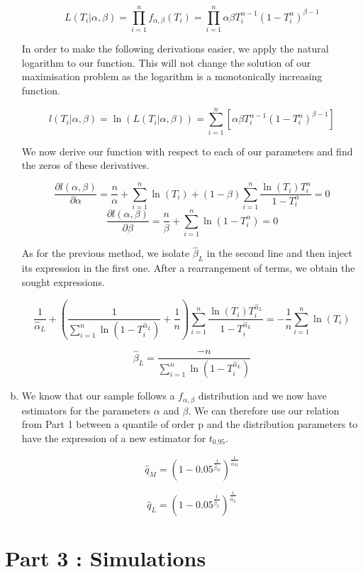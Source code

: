 \documentclass[a4paper]{article}
\begin{document}
\begin{enumerate}[(a)]
$$L(T_i|\alpha,\beta) = \prod_{i=1}^{n} f_{\alpha,\beta}(T_i) = \prod_{i=1}^{n} \alpha\beta T_i^{\alpha-1}(1-T_i^\alpha)^{\beta-1}$$

In order to make the following derivations easier, we apply the natural logarithm to our function. This will not change the solution of our maximisation problem as the logarithm is a monotonically increasing function.

$$l(T_i|\alpha,\beta) = \ln(L(T_i|\alpha,\beta)) = \sum_{i=1}^n \left [ \alpha\beta T_i^{\alpha-1}(1-T_i^\alpha)^{\beta-1} \right ]$$

We now derive our function with respect to each of our parameters and find the zeros of these derivatives.

$$ \frac{\partial l(\alpha, \beta)}{\partial \alpha} = \frac{n}{\alpha} + \sum_{i=1}^n \ln(T_i) + (1-\beta) \sum_{i=1}^{n} \frac{\ln(T_i) T_i^\alpha}{1-T_i^\alpha} = 0$$
$$ \frac{\partial l(\alpha, \beta)}{\partial \beta} = \frac{n}{\beta} + \sum_{i=1}^{n} \ln(1- T_i^\alpha)=0$$

As for the previous method, we isolate $\hat{\beta}_L$ in the second line and then inject its expression in the first one. After a rearrangement of terms, we obtain the sought expressions.

$$\frac{1}{\hat{\alpha}_L} + \left ( \frac{1}{\sum_{i=1}^n \ln(1-T_i^{\hat{\alpha}_L})} + \frac{1}{n}\right ) \sum_{i=1}^{n}\frac{\ln(T_i)T_i^{\hat{\alpha}_L}}{1-T_i^{\hat{\alpha}_L}} = - \frac{1}{n} \sum_{i=1}^n \ln(T_i)$$

$$\hat{\beta}_L = \frac{-n}{\sum_{i=1}^n \ln(1-T_i^{\hat{\alpha}_L})}$$

\item We know that our sample follows a $f_{\alpha,\beta}$ distribution and we now have estimators for the parameters $\alpha$ and $\beta$. We can therefore use our relation from Part 1 between a quantile of order p and the distribution parameters to have the expression of a new estimator for $t_{0.95}$.

$$ \hat{q}_M = (1-0.05^{\frac{1}{\hat{\beta}_M}})^{\frac{1}{\hat{\alpha}_M}}$$

$$ \hat{q}_L = (1-0.05^{\frac{1}{\hat{\beta}_L}})^{\frac{1}{\hat{\alpha}_L}}$$

\end{enumerate}


\section{Part 3 : Simulations}
\end{document}
